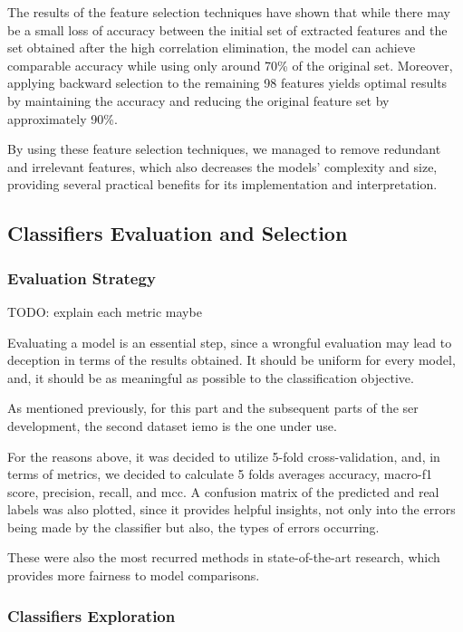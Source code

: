 The results of the feature selection techniques have shown that while there may be a small loss of accuracy between the initial set of extracted features and the set obtained after the high correlation elimination, the model can achieve comparable accuracy while using only around 70\% of the original set. Moreover, applying backward selection to the remaining 98 features yields optimal results by maintaining the accuracy and reducing the original feature set by approximately 90\%.

By using these feature selection techniques, we managed to remove redundant and irrelevant features, which also decreases the models' complexity and size, providing several practical benefits for its implementation and interpretation.


\subsection{Classifiers Evaluation and Selection}

\subsubsection{Evaluation Strategy}
TODO: explain each metric maybe

Evaluating a model is an essential step, since a wrongful evaluation may lead to deception in terms of the results obtained. It should be uniform for every model, and, it should be as meaningful as possible to the classification objective.

As mentioned previously, for this part and the subsequent parts of the \ac{ser} development, the second dataset \ac{iemo} is the one under use.

For the reasons above, it was decided to utilize 5-fold cross-validation, and, in terms of metrics, we decided to calculate 5 folds averages accuracy, macro-f1 score, precision, recall, and \ac{mcc}. A confusion matrix of the predicted and real labels was also plotted, since it provides helpful insights, not only into the errors being made by the classifier but also, the types of errors occurring.

These were also the most recurred methods in state-of-the-art research, which provides more fairness to model comparisons.

\subsubsection{Classifiers Exploration}

